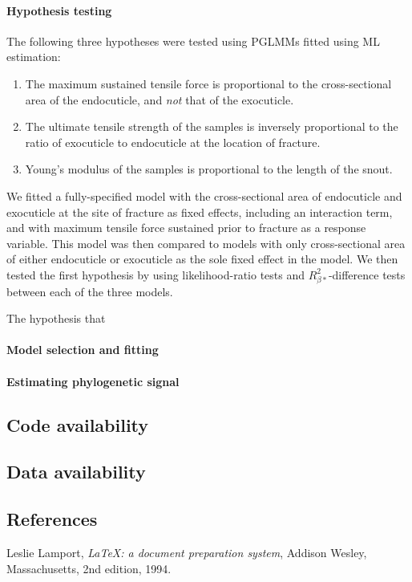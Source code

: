 \documentclass[twocolumn, linenumbers, superscriptaddress]{revtex4-1}
\begin{document}
			\paragraph*{Hypothesis testing}
				The following three hypotheses were tested using PGLMMs fitted using ML estimation:
				\begin{enumerate}
				\item The maximum sustained tensile force is proportional to the cross-sectional area of the endocuticle, and \emph{not} that of the exocuticle.
				\item The ultimate tensile strength of the samples is inversely proportional to the ratio of exocuticle to endocuticle at the location of fracture.
				\item Young's modulus of the samples is proportional to the length of the snout.
				\end{enumerate}
				
				We fitted a fully-specified model with the cross-sectional area of endocuticle and exocuticle at the site of fracture as fixed effects, including an interaction term, and with maximum tensile force sustained prior to fracture as a response variable.
				This model was then compared to models with only cross-sectional area of either endocuticle or exocuticle as the sole fixed effect in the model.
				We then tested the first hypothesis by using likelihood-ratio tests and $R^{2}_{\beta*}$-difference tests between each of the three models.
				
				The hypothesis that 
			
 
			\paragraph*{Model selection and fitting}
			\paragraph*{Estimating phylogenetic signal}
		
			
		\subsection*{Code availability}
			
		\subsection*{Data availability}

	\begin{thebibliography}{50}
		\section*{References}	
			Leslie Lamport,
			\textit{\LaTeX: a document preparation system},
			Addison Wesley, Massachusetts,
			2nd edition,
			1994.

	\end{thebibliography}
\end{document}
